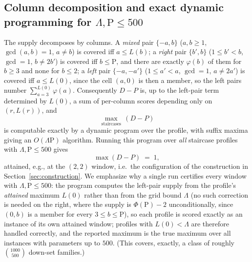 \documentclass[11pt]{article}
\theoremstyle{definition}
\begin{document}
\subsection{Column decomposition and exact dynamic programming for $\Lambda,\mathrm{P}\le 500$}\label{subsec:dp}
The supply decomposes by columns. A \emph{mixed} pair $\{-a,b\}$ ($a,b\ge1$, $\gcd(a,b)=1$, $a\ne b$) is covered iff $a\le L(b)$; a \emph{right} pair $\{b',b\}$ ($1\le b'<b$, $\gcd=1$, $b\ne 2b'$) is covered iff $b\le\mathrm{P}$, and there are exactly $\varphi(b)$ of them for $b\ge3$ and none for $b\le 2$; a \emph{left} pair $\{-a,-a'\}$ ($1\le a'<a$, $\gcd=1$, $a\ne 2a'$) is covered iff $a\le L(0)$, since the cell $(a,0)$ is then a member, so the left pairs number $\sum_{a=3}^{L(0)}\varphi(a)$. Consequently $D-P$ is, up to the left-pair term determined by $L(0)$, a sum of per-column scores depending only on $(r,L(r))$, and
\[ \max_{\text{staircases}}\,(D-P) \]
is computable exactly by a dynamic program over the profile, with suffix maxima giving an $O(\Lambda\mathrm{P})$ algorithm.\label{sec:dp} Running this program over \emph{all} staircase profiles with $\Lambda,\mathrm{P}\le 500$ gives
\[ \max (D-P) \;=\; 1, \]
attained, e.g., at the $(2,2)$ window, i.e.\ the configuration of the construction in Section~\ref{sec:construction}. We emphasize why a single run certifies every window with $\Lambda,\mathrm{P}\le500$: the program computes the left-pair supply from the profile's \emph{attained} maximum $L(0)$ rather than from the grid bound $\Lambda$ (no such correction is needed on the right, where the supply is $\Phi(\mathrm{P})-2$ unconditionally, since $(0,b)$ is a member for every $3\le b\le\mathrm{P}$), so each profile is scored exactly as an instance of its own attained window; profiles with $L(0)<\Lambda$ are therefore handled correctly, and the reported maximum is the true maximum over all instances with parameters up to $500$. (This covers, exactly, a class of roughly $\binom{1000}{500}$ down-set families.)
\end{document}
